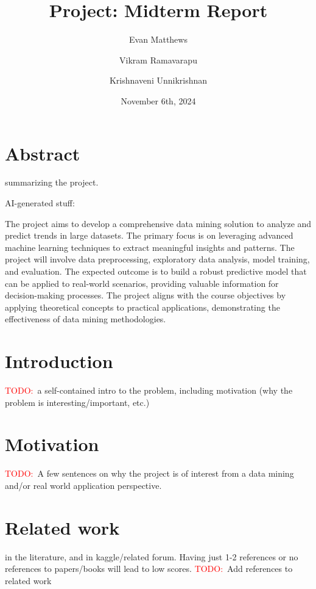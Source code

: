 \documentclass[11pt]{extarticle}
\title{Project: Midterm Report}
\author[1]{Evan Matthews}
\author[1]{Vikram Ramavarapu}
\author[1]{Krishnaveni Unnikrishnan}
\affil[1]{CS 412 Group G6}
\date{November 6th, 2024}
\newcommand{\todo}{\textcolor{red}{TODO:}~}
\begin{document}
\maketitle

\pagebreak


\section{Abstract}
summarizing the project\cite{Pettorruso2020-qt,Cash2012-rb,Aboujaoude2010-mc,Restrepo2020-pb}.

AI-generated stuff:
\begin{mdframed}
    The project aims to develop a comprehensive data mining solution to analyze and predict trends in large datasets. 
    The primary focus is on leveraging advanced machine learning techniques to extract meaningful insights and patterns. 
    The project will involve data preprocessing, exploratory data analysis, model training, and evaluation. 
    The expected outcome is to build a robust predictive model that can be applied to real-world scenarios, providing valuable information for decision-making processes. 
    The project aligns with the course objectives by applying theoretical concepts to practical applications, demonstrating the effectiveness of data mining methodologies.
\end{mdframed}

\section{Introduction}
\todo a self-contained intro to the problem, including motivation 
(why the problem is interesting/important, etc.)

\section{Motivation} 
\todo A few sentences on why the project is of interest from a data mining and/or real world application perspective.

\section{Related work} 
in the literature, and in kaggle/related forum. Having just 1-2 references or no references to papers/books will lead to low scores. 
\todo Add references to related work
\end{document}
